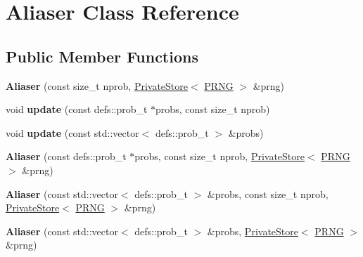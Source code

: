 \hypertarget{classAliaser}{}\section{Aliaser Class Reference}
\label{classAliaser}
\subsection*{Public Member Functions}
\begin{DoxyCompactItemize}
\item 
{\bfseries Aliaser} (const size\+\_\+t nprob, \hyperlink{classPrivateStore}{Private\+Store}$<$ \hyperlink{classPRNG}{P\+R\+NG} $>$ \&prng)\hypertarget{classAliaser_aa5f5b86c6595e0d3871173907eca510d}{}\label{classAliaser_aa5f5b86c6595e0d3871173907eca510d}

\item 
void {\bfseries update} (const defs\+::prob\+\_\+t $\ast$probs, const size\+\_\+t nprob)\hypertarget{classAliaser_a889ee75afc2c656b24a738fd8f71a0a3}{}\label{classAliaser_a889ee75afc2c656b24a738fd8f71a0a3}

\item 
void {\bfseries update} (const std\+::vector$<$ defs\+::prob\+\_\+t $>$ \&probs)\hypertarget{classAliaser_a701ef3f3e90a68a0cda812d2b3114b9e}{}\label{classAliaser_a701ef3f3e90a68a0cda812d2b3114b9e}

\item 
{\bfseries Aliaser} (const defs\+::prob\+\_\+t $\ast$probs, const size\+\_\+t nprob, \hyperlink{classPrivateStore}{Private\+Store}$<$ \hyperlink{classPRNG}{P\+R\+NG} $>$ \&prng)\hypertarget{classAliaser_aebe3aeea847f0e64a9d5d9d115939ca5}{}\label{classAliaser_aebe3aeea847f0e64a9d5d9d115939ca5}

\item 
{\bfseries Aliaser} (const std\+::vector$<$ defs\+::prob\+\_\+t $>$ \&probs, const size\+\_\+t nprob, \hyperlink{classPrivateStore}{Private\+Store}$<$ \hyperlink{classPRNG}{P\+R\+NG} $>$ \&prng)\hypertarget{classAliaser_aace600d68d2e1a8d7c3f56a75465cd1f}{}\label{classAliaser_aace600d68d2e1a8d7c3f56a75465cd1f}

\item 
{\bfseries Aliaser} (const std\+::vector$<$ defs\+::prob\+\_\+t $>$ \&probs, \hyperlink{classPrivateStore}{Private\+Store}$<$ \hyperlink{classPRNG}{P\+R\+NG} $>$ \&prng)\hypertarget{classAliaser_a54050a9dcb6cb807837a63bece7e7453}{}\label{classAliaser_a54050a9dcb6cb807837a63bece7e7453}


\end{DoxyCompactItemize}
